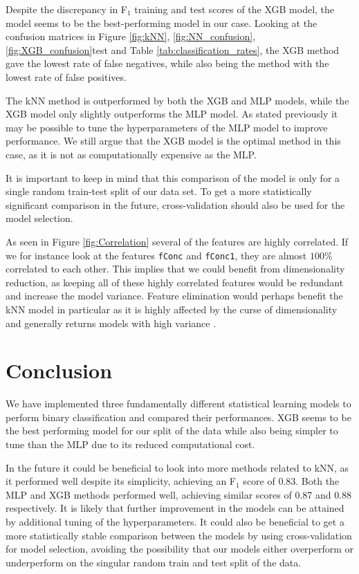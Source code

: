 \documentclass[a4paper, 11pt, twocolumn]{article}
\begin{document}
Despite the discrepancy in F$_1$ training and test scores of the XGB model, the 
model seems to be the best-performing model in our case. Looking at the 
confusion matrices in Figure \ref{fig:kNN}, \ref{fig:NN_confusion}, 
\ref{fig:XGB_confusion}test and Table \ref{tab:classification_rates}, the XGB 
method gave the lowest rate of false negatives, while also 
being the method with the lowest rate of false positives. 

The kNN method is outperformed by both the XGB and MLP models, while the XGB 
model only slightly outperforms the MLP model. As stated previously it may be 
possible to tune the hyperparameters of the MLP model to improve performance. 
We still argue that the XGB model is the optimal method in this case, as it is 
not as computationally expensive as the MLP. 

It is important to keep in mind that this comparison of the model is only for a 
single random train-test split of our data set. To get a more statistically 
significant comparison in the future, cross-validation should also be used for 
the model selection.

As seen in Figure \ref{fig:Correlation} several of the features are highly 
correlated. If we for instance look at the features \texttt{fConc} and 
\texttt{fConc1}, they are almost $100\%$ correlated to each other. This implies 
that we could benefit from dimensionality reduction, as keeping all of these 
highly correlated features would be redundant and increase the model variance. 
Feature elimination would perhaps benefit the kNN model in particular as it is 
highly affected by the curse of dimensionality and generally returns 
models with high variance \cite{hastie}. 


\section{Conclusion}
We have implemented three fundamentally different statistical learning models to 
perform binary classification and compared their performances. XGB seems to be 
the best performing model for our split of the data while also being simpler to 
tune than the MLP due to its reduced computational cost.

In the future it could be beneficial to look into more methods related to kNN, as
it performed well despite its simplicity, achieving an F$_1$ score of 0.83. 
Both the MLP and XGB methods performed well, achieving similar scores of 0.87 
and 0.88 respectively. It is likely that further improvement in the models can 
be attained by additional tuning of the hyperparameters.
It could also be beneficial to get a more statistically stable comparison 
between the models by using cross-validation for model selection, avoiding the 
possibility that our models either overperform or underperform on the singular 
random train and test split of the data.
\end{document}
